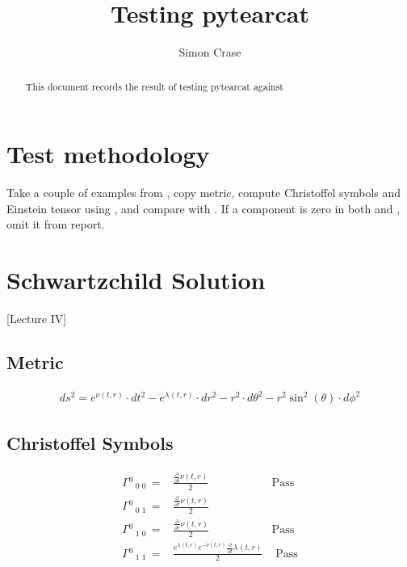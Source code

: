 \documentclass[]{article}
\title{Testing pytearcat}
\author{Simon Crase}
\begin{document}
\maketitle

\begin{abstract}
This document records the result of testing pytearcat\cite{san2021pytearcat} against \cite{akhmedov2016lectures}
\end{abstract}

\tableofcontents

\section{Test methodology}

Take a couple of examples from \cite{akhmedov2016lectures}, copy metric, compute Christoffel symbols and Einstein tensor using , and compare with \cite{akhmedov2016lectures}. If a component is zero in both \cite{akhmedov2016lectures} and \cite{san2021pytearcat}, omit it from report.
\section{Schwartzchild Solution}

\cite{akhmedov2016lectures}[Lecture IV]

\subsection{Metric}
\begin{align*}
	ds^2 = e^{\nu{\left(t,r \right)}} \cdot dt^2- e^{\lambda_{}{\left(t,r \right)}} \cdot dr^2- r^{2} \cdot d\theta^2- r^{2} \sin^{2}{\left(\theta \right)} \cdot d\phi^2
\end{align*}

\subsection{Christoffel Symbols}
\begin{align*}
	  {\Gamma}{}^{0}\,{}_{0}\,{}_{0}\, =& \frac{\frac{\partial}{\partial t} \nu{\left(t,r \right)}}{2}  & \text{Pass} \\
	 {\Gamma}{}^{0}\,{}_{0}\,{}_{1}\, =& \frac{\frac{\partial}{\partial r} \nu{\left(t,r \right)}}{2}\\
	 {\Gamma}{}^{0}\,{}_{1}\,{}_{0}\, =& \frac{\frac{\partial}{\partial r} \nu{\left(t,r \right)}}{2} & \text{Pass}\\	
	 {\Gamma}{}^{0}\,{}_{1}\,{}_{1}\, =& \frac{e^{\lambda_{}{\left(t,r \right)}} e^{- \nu{\left(t,r \right)}} \frac{\partial}{\partial t} \lambda_{}{\left(t,r \right)}}{2} & \text{ Pass}
\end{align*}
	
\end{document}
